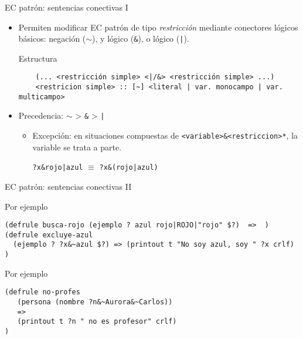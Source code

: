 \documentclass[usenames,dvipsnames,aspectratio=169]{beamer}
\begin{document}
\begin{frame}[fragile]{EC patrón: sentencias conectivas I}
	\begin{itemize}
		\item Permiten modificar EC patrón de tipo \textit{restricción} mediante conectores lógicos básicos: negación ($\sim$), y lógico (\texttt{\&}), o lógico (\texttt{|}).
		\begin{block}{Estructura}
			\begin{verbatim}
	(... <restricción simple> <|/&> <restricción simple> ...)
	<restricion simple> :: [~] <literal | var. monocampo | var. multicampo>
			\end{verbatim}
		\end{block}
		\item Precedencia: $\sim$ > \texttt{\&} > \texttt{|}
		\begin{itemize}
			\item Excepción: en situaciones compuestas de \texttt{<variable>\&<restriccion>*}, la variable se trata a parte.\\
			\begin{center}
				\texttt{?x\&rojo|azul} $\equiv$ \texttt{?x\&(rojo|azul)}
			\end{center}
		\end{itemize}
	\end{itemize}
\end{frame}

\begin{frame}[fragile]{EC patrón: sentencias conectivas II}
	\footnotesize
	\begin{exampleblock}{Por ejemplo}
		\begin{verbatim}
(defrule busca-rojo (ejemplo ? azul rojo|ROJO|"rojo" $?)  =>  )
(defrule excluye-azul
  (ejemplo ? ?x&~azul $?) => (printout t "No soy azul, soy " ?x crlf)
)
		\end{verbatim}
	\end{exampleblock}
	\begin{exampleblock}{Por ejemplo}
		\begin{verbatim}
(defrule no-profes
   (persona (nombre ?n&~Aurora&~Carlos))
   =>
   (printout t ?n " no es profesor" crlf)
)
		\end{verbatim}
	\end{exampleblock}
\end{frame}
\end{document}
